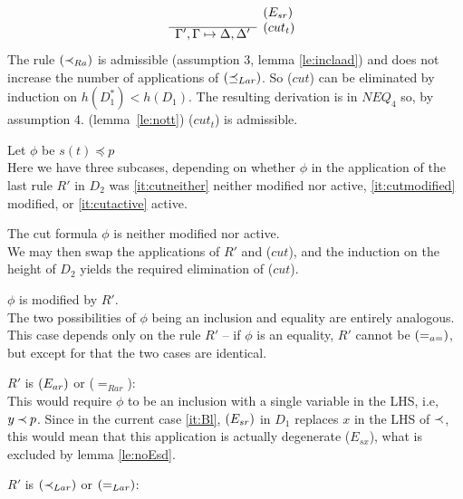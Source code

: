 \begin{PROOF}
\begin{LS}
\[\begin{array}{cl}
  & \rabove{\Esr} \\ \cline{1-1}
\Gamma',\GSD,\Delta' 
& \raisebox{1.2ex}[1.5ex][0ex]{($cut_t$)} 
\end{array} 
 \]
\noindent
The rule $(\mathbin{\prec}_{Ra})$ is admissible (assumption 3, lemma \ref{le:inclaad}) and
does not increase the number of
applications of $(\preceq_{Lar})$. So ($cut$)
can be eliminated by induction on $h(D_1^*)<h(D_1)$.
The resulting derivation is  in $NEQ_4$ so, by assumption 4. (lemma~\ref{le:nott})
($cut_t$) is admissible.
%
\item\label{it:Bl} Let $\phi$ be $s(t)\preceq p$ \\[.5ex]
\noindent
Here we have three subcases, depending on
whether $\phi$ in the application of the last rule $R'$ in $D_2$ was 
\ref{it:cutneither} neither modified nor active, \ref{it:cutmodified} modified, 
or \ref{it:cutactive} active.
%
\begin{LSA}
%
\item\label{it:cutneither} The cut formula $\phi$ is neither modified nor active.\\
We may then swap the
applications of $R'$ and ($cut$), and the induction on the height of $D_2$
yields the required elimination of ($cut$). 
%
\item\label{it:cutmodified}  $\phi$ is modified by $R'$.\\
The two possibilities of $\phi$ being an inclusion and equality are entirely 
analogous. This case depends only on the rule $R'$ -- if $\phi$ is an equality, 
$R'$ cannot be $(=_{a=})$, but except for that the two cases are identical.
%
 \begin{LSB}
   \item $R'$ is $(E_{ar})$ or ($=_{Rar}$): \\
  This would require $\phi$ to be an inclusion with  a single
   variable in the LHS, i.e, $y\mathbin{\prec} p$. %
Since in the current case \ref{it:Bl}, $(E_{sr})$ in $D_1$
   replaces $x$ in the LHS of $\mathbin{\prec}$, this would mean that this application is
   actually degenerate ($E_{sx}$), what is excluded by lemma \ref{le:noEsd}. 
\item  $R'$ is $(\mathbin{\prec}_{Lar})$ or $(=_{Lar})$: \\

\end{LSB}
\end{LSA}
\end{LS}
\end{PROOF}
